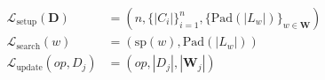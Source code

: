 \documentclass[preview,varwidth=88mm]{standalone}
\begin{document}
\begin{align*}
\mathcal{L}_{\text{setup}}(\mathbf{D}) &= \left( n, \{|C_i|\}_{i=1}^n, \{\text{Pad}(|L_w|)\}_{w \in \mathbf{W}} \right) \\
\mathcal{L}_{\text{search}}(w) &= \left( \text{sp}(w), \text{Pad}(|L_w|) \right) \\
\mathcal{L}_{\text{update}}(op, D_j) &= \left( op, |D_j|, |\mathbf{W}_j| \right)
\end{align*}
\end{document}
